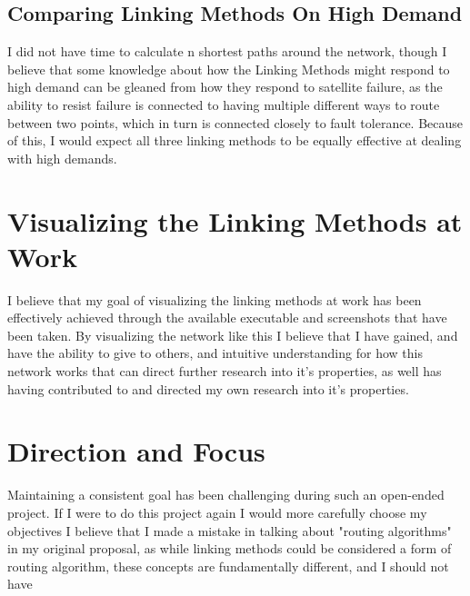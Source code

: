 \documentclass[12pt]{report}
\begin{document}

\subsection{Comparing Linking Methods On High Demand}
I did not have time to calculate n shortest paths around the network, though I believe that some knowledge about how the Linking Methods might respond to high demand can be gleaned from how they respond to satellite failure, as the ability to resist failure is connected to having multiple different ways to route between two points, which in turn is connected closely to fault tolerance. Because of this, I would expect all three linking methods to be equally effective at dealing with high demands.


\section{Visualizing the Linking Methods at Work}

I believe that my goal of visualizing the linking methods at work has been effectively achieved through the available executable and screenshots that have been taken. By visualizing the network like this I believe that I have gained, and have the ability to give to others, and intuitive understanding for how this network works that can direct further research into it's properties, as well has having contributed to and directed my own research into it's properties.

\section{Direction and Focus}

Maintaining a consistent goal has been challenging during such an open-ended project. If I were to do this project again I would more carefully choose my objectives I believe that I made a mistake in talking about "routing algorithms" in my original proposal, as while linking methods could be considered a form of routing algorithm, these concepts are fundamentally different, and I should not have 
\end{document}
